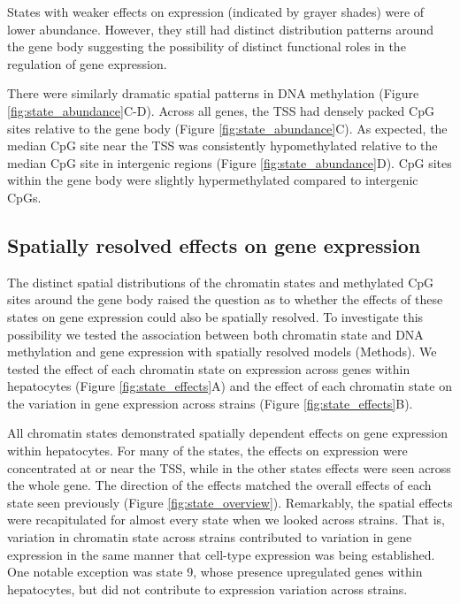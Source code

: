 \documentclass[10pt,letterpaper]{article}
\begin{document}
States with weaker effects on expression (indicated by grayer shades)
were of lower abundance. However, they still had distinct distribution
patterns around the gene body suggesting the possibility of distinct
functional roles in the regulation of gene expression.

There were similarly dramatic spatial patterns in DNA methylation
(Figure \ref{fig:state_abundance}C-D). Across all genes, the TSS had
densely packed CpG sites relative to the gene body (Figure
\ref{fig:state_abundance}C). As expected, the median CpG site near the
TSS was consistently hypomethylated relative to the median CpG site in
intergenic regions (Figure \ref{fig:state_abundance}D). CpG sites within
the gene body were slightly hypermethylated compared to intergenic CpGs.

\hypertarget{spatially-resolved-effects-on-gene-expression}{%
\subsection{Spatially resolved effects on gene
expression}\label{spatially-resolved-effects-on-gene-expression}}

The distinct spatial distributions of the chromatin states and
methylated CpG sites around the gene body raised the question as to
whether the effects of these states on gene expression could also be
spatially resolved. To investigate this possibility we tested the
association between both chromatin state and DNA methylation and gene
expression with spatially resolved models (Methods). We tested the
effect of each chromatin state on expression across genes within
hepatocytes (Figure \ref{fig:state_effects}A) and the effect of each
chromatin state on the variation in gene expression across strains
(Figure \ref{fig:state_effects}B).

All chromatin states demonstrated spatially dependent effects on gene
expression within hepatocytes. For many of the states, the effects on
expression were concentrated at or near the TSS, while in the other
states effects were seen across the whole gene. The direction of the
effects matched the overall effects of each state seen previously
(Figure \ref{fig:state_overview}). Remarkably, the spatial effects were
recapitulated for almost every state when we looked across strains. That
is, variation in chromatin state across strains contributed to variation
in gene expression in the same manner that cell-type expression was
being established. One notable exception was state 9, whose presence
upregulated genes within hepatocytes, but did not contribute to
expression variation across strains.
\end{document}
